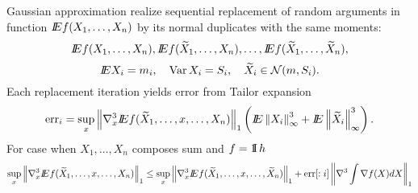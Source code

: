 



\usepackage{flowchart}
\usetikzlibrary{arrows}

\usepackage{natbib}



 
  
  
  Gaussian approximation realize sequential replacement of random arguments in function $ I\!\!E f(X_1,\ldots,X_n)$ by its normal duplicates with the same moments:
  \[
  I\!\!E f(X_1,\ldots,X_n), I\!\!E f(\widetilde{X}_1,\ldots,X_n), \ldots, I\!\!E f(\widetilde{X}_1,\ldots,\widetilde{X}_n),
  \] 
  \[
  I\!\!E X_i  = m_i, 
  \quad
  \operatorname{Var} X_i = S_i,
  \quad
  \widetilde{X}_i \in \mathcal{N}(m, S_i).
  \]
  Each replacement iteration yields error from Tailor expansion 
  \[
  \text{err}_i = \sup_{x} \left\Vert \nabla_x^3 I\!\!E f(\widetilde{X}_1,\ldots, x ,\ldots,X_n) \right\Vert_1 \left( I\!\!E \left\Vert X_i \right\Vert_{\infty}^3 + I\!\!E \left\Vert \widetilde{X}_i \right\Vert_{\infty}^3 \right).
  \] 
  For case when $X_1,\ldots,X_n$ composes sum and $f = \operatorname{1}\hspace{-4.3pt}\operatorname{I} h$ 
  \[
   \sup_{x} \left\Vert \nabla_x^3 I\!\!E f(\widetilde{X}_1, \ldots, x ,\ldots,X_n) \right\Vert_1 \leq  \sup_{x} \left\Vert \nabla_x^3 I\!\!E f(\widetilde{X}_1, \ldots, x ,\ldots, \widetilde{X}_n) \right\Vert_1 + \text{err}[:i]  \left\Vert   \nabla^3 \int     \nabla f(X) dX \right\Vert_1
  \]
  
  
  